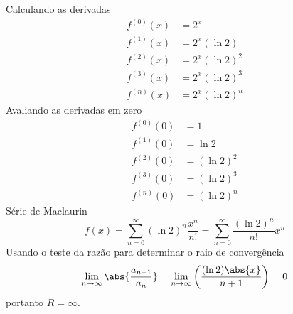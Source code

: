 \begin{exercises}
\begin{exercise}
\begin{answer}
\begin{alphalist}
  \item Calculando as derivadas
  \begin{align*}
  	f^{(0)}(x) & = 2^x           \\
  	f^{(1)}(x) & = 2^x (\ln 2)   \\
  	f^{(2)}(x) & = 2^x (\ln 2)^2 \\
  	f^{(3)}(x) & = 2^x (\ln 2)^3 \\
  	f^{(n)}(x) & = 2^x (\ln 2)^n
  \end{align*}
  Avaliando as derivadas em zero
  \begin{align*}
  	f^{(0)}(0) & = 1         \\
  	f^{(1)}(0) & = \ln 2     \\
  	f^{(2)}(0) & = (\ln 2)^2 \\
  	f^{(3)}(0) & = (\ln 2)^3 \\
  	f^{(n)}(0) & = (\ln 2)^n
  \end{align*}
  Série de Maclaurin
  \[
    f(x) = \sum_{n=0}^\infty (\ln 2)^n \frac{x^n}{n!}
         = \sum_{n=0}^\infty \frac{(\ln 2)^n}{n!} x^n
  \]
  Usando o teste da razão para determinar o raio de convergência
  \[
    \lim_{n\to\infty}\abs{\frac{a_{n+1}}{a_n}} =
    \lim_{n\to\infty}\left(\frac{(\ln 2)\abs{x}}{n+1}\right) = 0
  \]
  portanto $R=\infty$.


\end{alphalist}
\end{answer}
\end{exercise}
\end{exercises}
